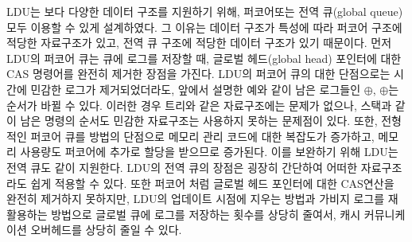 LDU는 보다 다양한 데이터 구조를 지원하기 위해, 퍼코어또는 전역 큐(global queue) 모두 이용할 수 있게 설계하였다.
그 이유는 데이터 구조가 특성에 따라 퍼코어 구조에 적당한 자료구조가 있고,
전역 큐 구조에 적당한 데이터 구조가 있기 때문이다.
먼저 LDU의 퍼코어 큐는 큐에 로그를 저장할 때, 글로벌 헤드(global head) 포인터에 대한 CAS
명령어를 완전히 제거한 장점을 가진다.
LDU의 퍼코어 큐의 대한 단점으로는 시간에 민감한 로그가 제거되었더라도,
앞에서 설명한 예와 같이 남은 로그들인 $\oplus$, $\oplus$는 순서가 바뀔 수 있다.
이러한 경우 트리와 같은 자료구조에는 문제가 없으나, 스택과 같이 남은 명령의
순서도 민감한 자료구조는 사용하지 못하는 문제점이 있다.
또한, 전형적인 퍼코어 큐를 방법의 단점으로 메모리 관리 코드에 대한 복잡도가 증가하고, 
메모리 사용량도 퍼코어에 추가로 할당을 받으므로 증가된다.
이를 보완하기 위해 LDU는 전역 큐도 같이 지원한다.
LDU의 전역 큐의 장점은 굉장히 간단하여 어떠한 자료구조라도 쉽게 적용할 수 있다. 
또한 퍼코어 처럼 글로벌 헤드 포인터에 대한 CAS연산을 완전히 제거하지 못하지만, LDU의 업데이트 시점에 
지우는 방법과 가비지 로그를 재활용하는 방법으로 글로벌 큐에 로그를 저장하는 횟수를 상당히 줄여서, 
캐시 커뮤니케이션 오버헤드를 상당히 줄일 수 있다. 

